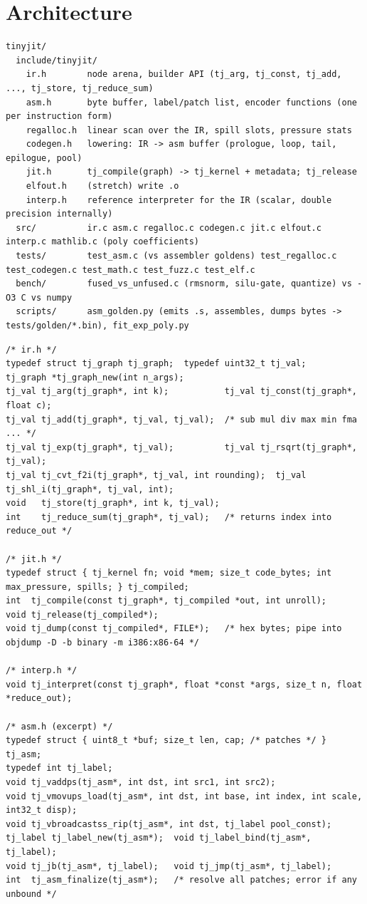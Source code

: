 \section{Architecture}

\begin{lstlisting}[style=plain]
tinyjit/
  include/tinyjit/
    ir.h        node arena, builder API (tj_arg, tj_const, tj_add, ..., tj_store, tj_reduce_sum)
    asm.h       byte buffer, label/patch list, encoder functions (one per instruction form)
    regalloc.h  linear scan over the IR, spill slots, pressure stats
    codegen.h   lowering: IR -> asm buffer (prologue, loop, tail, epilogue, pool)
    jit.h       tj_compile(graph) -> tj_kernel + metadata; tj_release
    elfout.h    (stretch) write .o
    interp.h    reference interpreter for the IR (scalar, double precision internally)
  src/          ir.c asm.c regalloc.c codegen.c jit.c elfout.c interp.c mathlib.c (poly coefficients)
  tests/        test_asm.c (vs assembler goldens) test_regalloc.c test_codegen.c test_math.c test_fuzz.c test_elf.c
  bench/        fused_vs_unfused.c (rmsnorm, silu-gate, quantize) vs -O3 C vs numpy
  scripts/      asm_golden.py (emits .s, assembles, dumps bytes -> tests/golden/*.bin), fit_exp_poly.py
\end{lstlisting}

\begin{lstlisting}[style=c]
/* ir.h */
typedef struct tj_graph tj_graph;  typedef uint32_t tj_val;
tj_graph *tj_graph_new(int n_args);
tj_val tj_arg(tj_graph*, int k);           tj_val tj_const(tj_graph*, float c);
tj_val tj_add(tj_graph*, tj_val, tj_val);  /* sub mul div max min fma ... */
tj_val tj_exp(tj_graph*, tj_val);          tj_val tj_rsqrt(tj_graph*, tj_val);
tj_val tj_cvt_f2i(tj_graph*, tj_val, int rounding);  tj_val tj_shl_i(tj_graph*, tj_val, int);
void   tj_store(tj_graph*, int k, tj_val);
int    tj_reduce_sum(tj_graph*, tj_val);   /* returns index into reduce_out */

/* jit.h */
typedef struct { tj_kernel fn; void *mem; size_t code_bytes; int max_pressure, spills; } tj_compiled;
int  tj_compile(const tj_graph*, tj_compiled *out, int unroll);
void tj_release(tj_compiled*);
void tj_dump(const tj_compiled*, FILE*);   /* hex bytes; pipe into objdump -D -b binary -m i386:x86-64 */

/* interp.h */
void tj_interpret(const tj_graph*, float *const *args, size_t n, float *reduce_out);

/* asm.h (excerpt) */
typedef struct { uint8_t *buf; size_t len, cap; /* patches */ } tj_asm;
typedef int tj_label;
void tj_vaddps(tj_asm*, int dst, int src1, int src2);
void tj_vmovups_load(tj_asm*, int dst, int base, int index, int scale, int32_t disp);
void tj_vbroadcastss_rip(tj_asm*, int dst, tj_label pool_const);
tj_label tj_label_new(tj_asm*);  void tj_label_bind(tj_asm*, tj_label);
void tj_jb(tj_asm*, tj_label);   void tj_jmp(tj_asm*, tj_label);
int  tj_asm_finalize(tj_asm*);   /* resolve all patches; error if any unbound */
\end{lstlisting}

